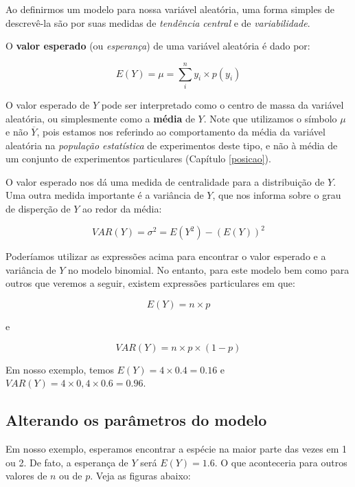 \documentclass[
]{book}
\begin{document}
Ao definirmos um modelo para nossa variável aleatória, uma forma simples de descrevê-la são por suas medidas de \emph{tendência central} e de \emph{variabilidade}.

O \textbf{valor esperado} (ou \emph{esperança}) de uma variável aleatória é dado por:

\[E(Y) = \mu = \sum_i^n y_i \times p(y_i)\]

O valor esperado de \(Y\) pode ser interpretado como o centro de massa da variável aleatória, ou simplesmente como a \textbf{média} de \(Y\). Note que utilizamos o símbolo \(\mu\) e não \(\overline{Y}\), pois estamos nos referindo ao comportamento da média da variável aleatória na \emph{população estatística} de experimentos deste tipo, e não à média de um conjunto de experimentos particulares (Capítulo \ref{posicao}).

O valor esperado nos dá uma medida de centralidade para a distribuição de \(Y\). Uma outra medida importante é a variância de \(Y\), que nos informa sobre o grau de disperção de \(Y\) ao redor da média:

\[VAR(Y) = \sigma^2 = E(Y^2) - (E(Y))^2\]

Poderíamos utilizar as expressões acima para encontrar o valor esperado e a variância de \(Y\) no modelo binomial. No entanto, para este modelo bem como para outros que veremos a seguir, existem expressões particulares em que:

\[E(Y) = n \times p\]

e

\[VAR(Y) = n \times p \times (1-p)\]

Em nosso exemplo, temos \(E(Y) = 4 \times 0.4 = 0.16\) e \(VAR(Y) = 4 \times 0,4 \times 0.6 = 0.96\).

\hypertarget{alterando-os-paruxe2metros-do-modelo}{%
\subsection*{Alterando os parâmetros do modelo}\label{alterando-os-paruxe2metros-do-modelo}}

Em nosso exemplo, esperamos encontrar a espécie na maior parte das vezes em 1 ou 2. De fato, a esperança de \(Y\) será \(E(Y) = 1.6\). O que aconteceria para outros valores de \(n\) ou de \(p\). Veja as figuras abaixo:
\end{document}
